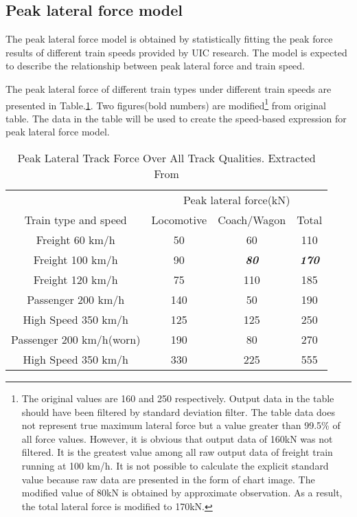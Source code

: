 \subsection{Peak lateral force model}\label{sec:peaklateralforcemodel}

The peak lateral force model is obtained by statistically fitting the peak force results of different train speeds provided by UIC research\citep{d181dt329}. The model is expected to describe the relationship between peak lateral force and train speed. 

The peak lateral force of different train types under different train speeds are presented in Table.\ref{tab:peaklateralforce}. Two figures(bold numbers) are modified\footnote{
	The original values are 160 and 250 respectively. Output data in the table should have been filtered by standard deviation filter. The table data does not represent true maximum lateral force but a value greater than 99.5\% of all force values. However, it is obvious that output data of 160kN was not filtered. It is the greatest value among all raw output data of freight train running at 100 km/h. It is not possible to calculate the explicit standard value because raw data are presented in the form of chart image. The modified value of 80kN is obtained by approximate observation. As a result, the total lateral force is modified to 170kN.} from original table.
The data in the table will be used to create the speed-based expression for peak lateral force model. 

\begin{table}[h!]
    \centering
    \caption{Peak Lateral Track Force Over All Track Qualities. Extracted From \citet[Tab. B1]{d181dt329}}
    \begin{tabular}{cccc}

        \hline
         & \multicolumn{3}{c}{Peak lateral force(kN)} \\
        Train type and speed & Locomotive & Coach/Wagon & Total \\ 
        \hline
        Freight 60 km/h & 50 & 60 & 110\\
        Freight 100 km/h & 90 & \textbf{\textit{80}}& \textbf{\textit{170}}\\
        Freight 120 km/h & 75 & 110 & 185 \\
        Passenger 200 km/h & 140 & 50 & 190 \\
        High Speed 350 km/h & 125 & 125 & 250 \\
        Passenger 200 km/h(worn) & 190 & 80 & 270 \\
        High Speed 350 km/h & 330 & 225 & 555 \\
        \hline
    \end{tabular}
    \label{tab:peaklateralforce}
\end{table}

